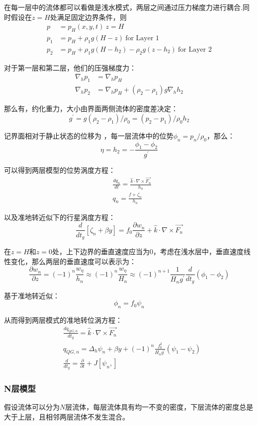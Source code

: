 \documentclass{article}
\begin{document}
在每一层中的流体都可以看做是浅水模式，两层之间通过压力梯度力进行耦合.同时假设在$z=H$处满足固定边界条件，则
\begin{align}
p&=p_H(x,y,t) \ z=H \\
p_1&=p_H + \rho_1 g(H-z)  \ \text{for Layer 1} \\
p_2&=p_H + \rho_1 g(H-h_2) - \rho_2 g(z-h_2)  \ \text{for Layer 2}
\end{align}

对于第一层和第二层，他们的压强梯度力：
\begin{align}
\nabla_h p_1 &= \nabla_h p_H \\
\nabla_h p_2 &= \nabla_h p_H + (\rho_2-\rho_1)g\nabla_hh_2 
\end{align}

那么有，约化重力，大小由界面两侧流体的密度差决定：
$$g^{\prime} = g(\rho_2-\rho_1)/\rho_0 = (p_2-p_1)/\rho_0h_2$$

记界面相对于静止状态的位移为 ，每一层流体中的位势$\phi_n=p_n/\rho_0$，那么：
$$\eta=h_2=-\frac{\phi_1-\phi_2}{g^{\prime}}$$

可以得到两层模型的位势涡度方程：
\begin{align}
&\frac{dq_n}{dt}=\frac{\hat{k}\cdot\nabla\times\vec{F_n}}{h_n}\\
&q_n=\frac{f+\zeta_n}{h_n}   
\end{align}

以及准地转近似下的行星涡度方程：
$$\frac{d}{dt_g}[\zeta_n+\beta y]=f_0\frac{\partial w_n}{\partial z}+\hat{k}\cdot\nabla\times\vec{F_n}$$

在$z=H$和$z=0$处，上下边界的垂直速度应当为0，考虑在浅水层中，垂直速度线性变化，那么两层的垂直速度可以表示为：
$$\frac{\partial w_n}{\partial z}=(-1)^n\frac{w_\eta}{h_n}\approx(-1)^n\frac{w_\eta}{H_n}\approx(-1)^{n+1}\frac{1}{H_ng^{\prime}}\frac{d}{dt_g}(\phi_1-\phi_2)$$

基于准地转近似：
$$\phi_n=f_0\psi_n$$

从而得到两层模式的准地转位涡方程：
\begin{align}
    &\frac{dq_{QG,n}}{dt_g} = \hat{k}\cdot\nabla\times\vec{F_n} \\
    &q_{QG,n} = \Delta_h \psi_n + \beta y + (-1)^{n}\frac{f_0^2}{H_ng^{\prime}}(\psi_1-\psi_2)\\
    &\frac{d}{dt_g} = \frac{\partial }{\partial t} + J[\psi_n, ]
\end{align}


\subsubsection{N层模型}
假设流体可以分为$N$层流体，每层流体具有均一不变的密度，下层流体的密度总是大于上层，且相邻两层流体不发生混合。
\end{document}
